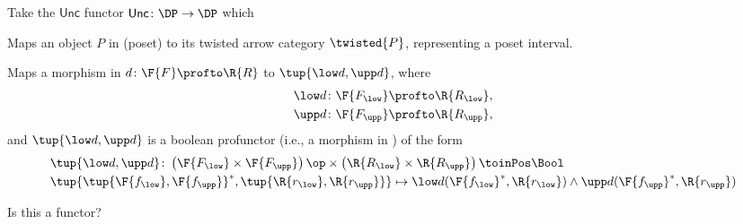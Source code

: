 Take the $\mathsf{Unc}$ functor $\mathsf{Unc}\colon \DP\to \DP$ which
\begin{compactenum}
    \item Maps an object $P$ in \DP (poset) to its twisted arrow category $\twisted{P}$, representing a poset interval.
    \item Maps a morphism in \DP $d\colon \F{F}\profto \R{R}$ to $\tup{\low d,\upp d}$, where
    \begin{equation}
        \begin{aligned}
            \low d\colon \F{F_{\low}}&\profto \R{R_{\low}},\\
            \upp d\colon \F{F_{\upp}}&\profto \R{R_{\upp}},
        \end{aligned}
    \end{equation}
    and $\tup{\low d,\upp d}$ is a boolean profunctor (i.e., a morphism in \DP) of the form
    \begin{equation}
        \begin{aligned}
            &\tup{\low d,\upp d}\colon \left(\F{F_{\low}}\times \F{F_{\upp}} \right)\op \times \left(\R{R_{\low}}\times \R{R_{\upp}} \right)\toinPos \Bool\\
            &\tup{\tup{\F{f_{\low}},\F{f_{\upp}}}^*,\tup{\R{r_{\low}},\R{r_{\upp}}}}\mapsto \low d(\F{f_{\low}}^*,\R{r_{\low}})\wedge \upp d(\F{f_{\upp}}^*,\R{r_{\upp}})
        \end{aligned}
    \end{equation}
\end{compactenum}

Is this a functor?

